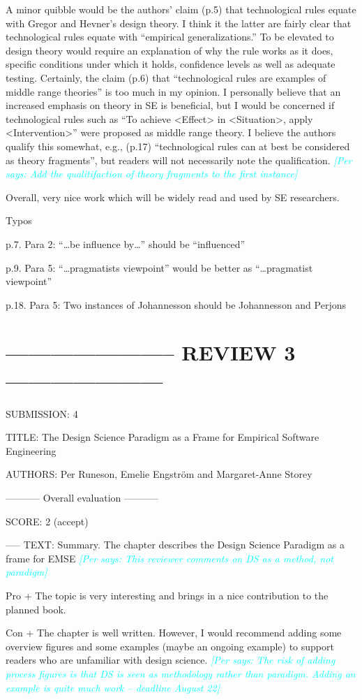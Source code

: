 \documentclass{article}
\newcommand{\per}[1]{\textcolor{cyan}{{\it [Per says: #1]}}}
\newcommand{\per}[1]{}
\begin{document}
A minor quibble would be the authors’ claim (p.5) that technological rules equate with Gregor and Hevner’s design theory.  I think it the latter are fairly clear that technological rules equate with “empirical generalizations.”  To be elevated to design theory would require an explanation of why the rule works as it does, specific conditions under which it holds, confidence levels as well as adequate testing. Certainly, the claim (p.6) that “technological rules are examples of middle range theories” is too much in my opinion. I personally believe that an increased emphasis on theory in SE is beneficial, but I would be concerned if technological rules such as “To achieve <Effect> in <Situation>, apply <Intervention>” were proposed as middle range theory. I believe the authors qualify this somewhat, e.g., (p.17) “technological rules can at best be considered as theory fragments”, but readers will not necessarily note the qualification. \per{Add the qualitifaction of theory \emph{fragments} to the first instance}
 
Overall, very nice work which will be widely read and used by SE researchers.
 

Typos
 
p.7. Para 2: “…be influence by…” should be “influenced”
 
p.9. Para 5: “…pragmatists viewpoint” would be better as “…pragmatist viewpoint”
 
p.18. Para 5: Two instances of Johannesson should be Johannesson and Perjons



\section*{----------------------- REVIEW 3 ---------------------}
SUBMISSION: 4

TITLE: The Design Science Paradigm as a Frame for Empirical Software Engineering

AUTHORS: Per Runeson, Emelie Engström and Margaret-Anne Storey

----------- Overall evaluation -----------

SCORE: 2 (accept)

----- TEXT:
Summary. The chapter describes the Design Science Paradigm as a frame for EMSE 
\per{This reviewer comments on DS as a method, not paradigm}

Pro
+ The topic is very interesting and brings in a nice contribution to the planned book.

Con
+ The chapter is well written. However, I would recommend adding some overview figures and some examples (maybe an ongoing example) to support readers who are unfamiliar with design science. \per{The risk of adding process figures is that DS is seen as methodology rather than paradigm. Adding an example is quite much work -- deadline August 22}
\end{document}
